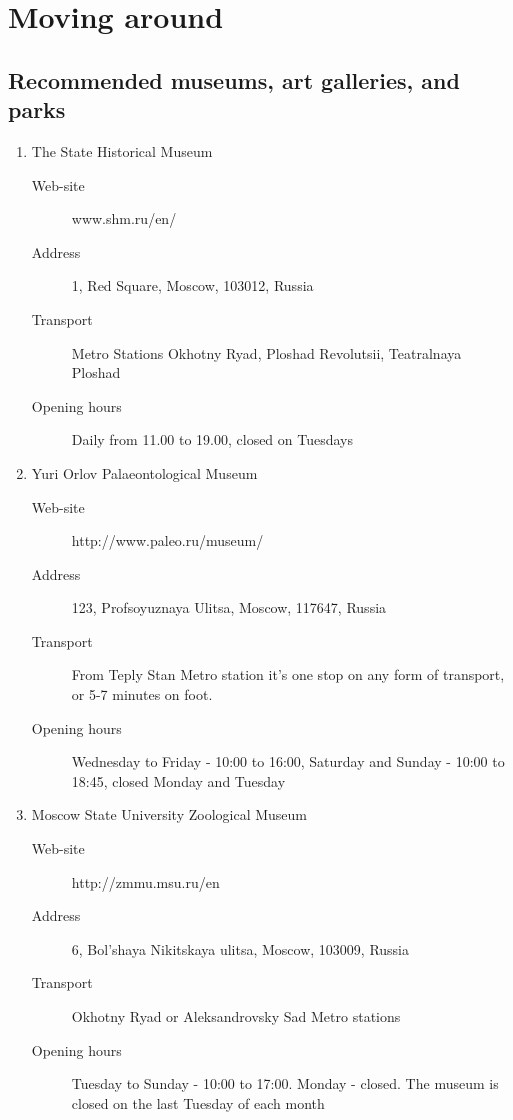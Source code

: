 \documentclass[10pt,fleqn,openany]{book} %
\begin{document}


\chapter{Moving around}

\section{Recommended museums, art galleries, and parks}

\begin{enumerate}
	\item The State Historical Museum
		\begin{description}
			\item[Web-site] www.shm.ru/en/
			\item[Address] 1, Red Square, Moscow, 103012, Russia 
			\item[Transport] Metro Stations Okhotny Ryad, Ploshad Revolutsii, Teatralnaya Ploshad
			\item[Opening hours] Daily from 11.00 to 19.00, closed on Tuesdays
		\end{description}

	\item 	Yuri Orlov Palaeontological Museum
		\begin{description}
			\item[Web-site] http://www.paleo.ru/museum/ 
			\item[Address] 123, Profsoyuznaya Ulitsa, Moscow, 117647, Russia 
			\item[Transport] From Teply Stan Metro station it's one stop on any form of transport, or 5-7 minutes on foot.
			\item[Opening hours] Wednesday to Friday - 10:00 to 16:00, Saturday and Sunday - 10:00 to 18:45, closed Monday and Tuesday
		\end{description}

	\item Moscow State University Zoological Museum
		\begin{description}
			\item[Web-site] http://zmmu.msu.ru/en
			\item[Address] 6, Bol'shaya Nikitskaya ulitsa, Moscow, 103009, Russia 
			\item[Transport] Okhotny Ryad or Aleksandrovsky Sad Metro stations
			\item[Opening hours] Tuesday to Sunday - 10:00 to 17:00. Monday - closed. The museum is closed on the last Tuesday of each month
		\end{description}


\end{enumerate}
\end{document}
